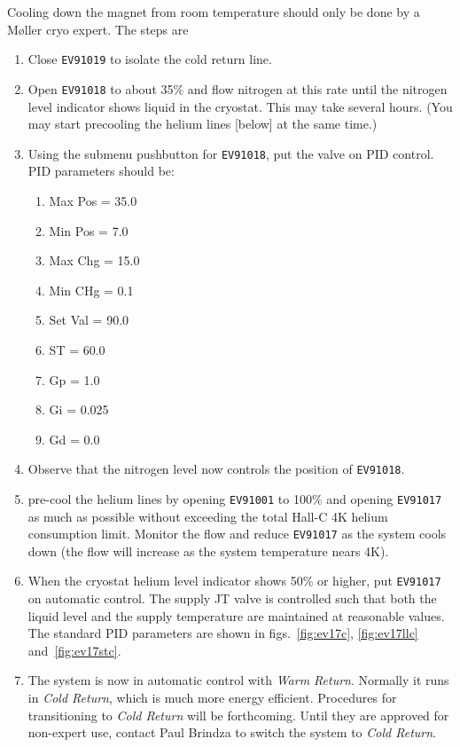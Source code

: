 {Cooling down the magnet from room temperature should only be done
by a M\o ller cryo expert. The steps are
\begin{enumerate}
	\item Close {\tt EV91019} to isolate the cold return line.
	\item Open {\tt EV91018} to about 35\% and flow nitrogen at this rate
		until the nitrogen level indicator shows liquid in the cryostat.
		This may take several hours. (You may start precooling the helium
		lines [below] at the same time.)
	\item Using the submenu pushbutton for {\tt EV91018}, put the valve on
		PID control. PID parameters should be:
	\begin{enumerate}
		\item Max Pos = 35.0
		\item Min Pos = 7.0
		\item Max Chg = 15.0
		\item Min CHg = 0.1
		\item Set Val = 90.0
		\item ST = 60.0
		\item Gp = 1.0
		\item Gi = 0.025
		\item Gd = 0.0
	\end{enumerate}
	\item Observe that the nitrogen level now controls the position of {\tt EV91018}.
	\item pre-cool the helium lines by opening {\tt EV91001} to 100\% and
		opening {\tt EV91017} as much as possible without exceeding the total
		Hall-C 4K helium consumption limit. Monitor the flow and 
		reduce {\tt EV91017} as the system cools down (the flow will 
		increase as the system temperature nears 4K).
	\item When the cryostat helium level indicator shows 50\% or higher, put
		{\tt EV91017} on automatic control. The supply JT valve is controlled 
		such that both the liquid level and the supply temperature are maintained
		at reasonable values. The standard PID parameters are shown in 
		figs.~\ref{fig:ev17c}, \ref{fig:ev17llc} and~\ref{fig:ev17stc}.
	\item The system is now in automatic control with {\it Warm Return}. Normally it
		runs in {\it Cold Return}, which is much more energy efficient. Procedures
		for transitioning to {\it Cold Return} will be forthcoming. Until they
		are approved for non-expert use, contact Paul Brindza to switch the
		system to {\it Cold Return}.
\end{enumerate}

}
